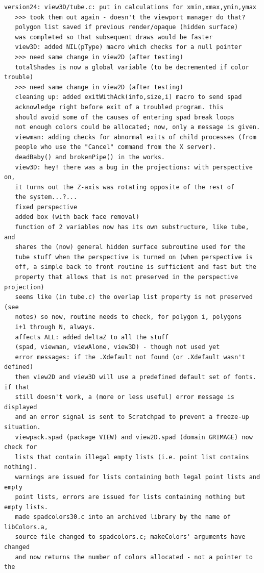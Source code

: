 \documentclass{article}
\begin{document}
\begin{verbatim}
version24: view3D/tube.c: put in calculations for xmin,xmax,ymin,ymax
   >>> took them out again - doesn't the viewport manager do that?
   polygon list saved if previous render/opaque (hidden surface)
   was completed so that subsequent draws would be faster
   view3D: added NIL(pType) macro which checks for a null pointer
   >>> need same change in view2D (after testing)
   totalShades is now a global variable (to be decremented if color trouble)
   >>> need same change in view2D (after testing)
   cleaning up: added exitWithAck(info,size,i) macro to send spad
   acknowledge right before exit of a troubled program. this
   should avoid some of the causes of entering spad break loops
   not enough colors could be allocated; now, only a message is given.
   viewman: adding checks for abnormal exits of child processes (from
   people who use the "Cancel" command from the X server).
   deadBaby() and brokenPipe() in the works.
   view3D: hey! there was a bug in the projections: with perspective on,
   it turns out the Z-axis was rotating opposite of the rest of
   the system...?...
   fixed perspective
   added box (with back face removal)
   function of 2 variables now has its own substructure, like tube, and
   shares the (now) general hidden surface subroutine used for the
   tube stuff when the perspective is turned on (when perspective is
   off, a simple back to front routine is sufficient and fast but the
   property that allows that is not preserved in the perspective projection)
   seems like (in tube.c) the overlap list property is not preserved (see
   notes) so now, routine needs to check, for polygon i, polygons
   i+1 through N, always.
   affects ALL: added deltaZ to all the stuff
   (spad, viewman, viewAlone, view3D) - though not used yet
   error messages: if the .Xdefault not found (or .Xdefault wasn't defined)
   then view2D and view3D will use a predefined default set of fonts. if that
   still doesn't work, a (more or less useful) error message is displayed
   and an error signal is sent to Scratchpad to prevent a freeze-up situation.
   viewpack.spad (package VIEW) and view2D.spad (domain GRIMAGE) now check for
   lists that contain illegal empty lists (i.e. point list contains nothing).
   warnings are issued for lists containing both legal point lists and empty
   point lists, errors are issued for lists containing nothing but empty lists.
   made spadcolors30.c into an archived library by the name of libColors.a,
   source file changed to spadcolors.c; makeColors' arguments have changed
   and now returns the number of colors allocated - not a pointer to the

\end{verbatim}
\end{document}
